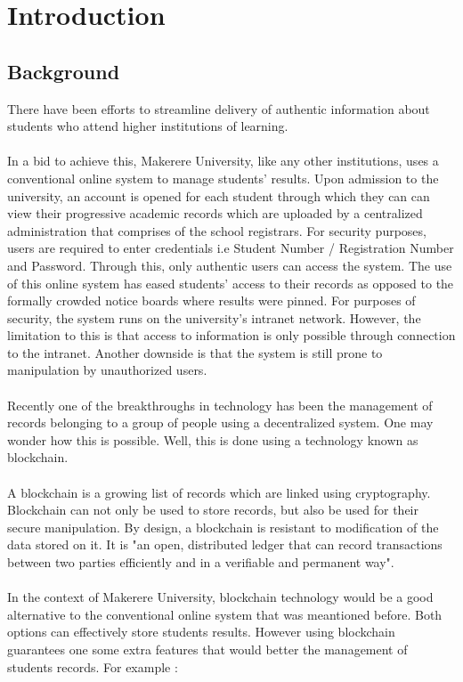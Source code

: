 \chapter{Introduction}

\section{Background}
There have been efforts to streamline delivery of authentic information about students who attend higher institutions of learning. \\~\\
In a bid to achieve this, Makerere University, like any other institutions, uses a conventional online system to manage students' results. Upon admission to the university, an account is opened for each student through which they can can view their progressive academic records which are uploaded by a centralized administration that comprises of the school registrars. For security purposes, users are required to enter credentials i.e Student Number / Registration Number and Password. Through this, only authentic users can access the system. The use of this online system has eased students' access to their records as opposed to the formally crowded notice boards where results were pinned. For purposes of security, the system runs on the university's intranet network. However, the limitation to this is that access to information is only possible through connection to the intranet. Another downside is that the system is still prone to manipulation by unauthorized users.\\\\
Recently one of the breakthroughs in technology has been the management of records belonging to a group of people using a decentralized system. One may wonder how this is possible. Well, this is done using a technology known as blockchain.\\\\
A blockchain is a growing list of records which are linked using cryptography\cite{art1}. Blockchain can not only be used to store records, but also be used for their secure manipulation. By design, a blockchain is resistant to modification of the data stored on it. It is "an open, distributed ledger that can record transactions between two parties efficiently and in a verifiable and permanent way".\\\\
In the context of Makerere University, blockchain technology would be a good alternative to the conventional online system that was meantioned before. Both options can effectively store students results. However using blockchain guarantees one some extra features that would better the management of students records. For example \cite{art2} :\\\\
